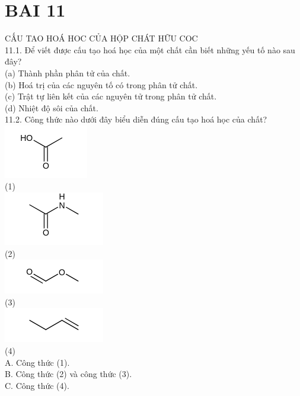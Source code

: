 \documentclass[10pt]{article}
\begin{document}
\section*{BAI 11}
CẤU TAO HOÁ HOC CỦA HỘP CHÁT HỮU COC\\
11.1. Để viết được cấu tạo hoá học của một chất cần biết những yếu tố nào sau đây?\\
(a) Thành phần phân tử của chất.\\
(b) Hoá trị của các nguyên tố có trong phân tử chất.\\
(c) Trật tự liên kết của các nguyên tử trong phân tử chất.\\
(d) Nhiệt độ sôi của chất.\\
11.2. Công thức nào dưới đây biểu diễn đúng cấu tạo hoá học của chất?\\
\includegraphics{smile-9000b27412d205ecfecaef73471a400232ff3abb}\\
(1)\\
\includegraphics{smile-0c114765a9fce6331c4c2db89276fe2851534cd4}\\
(2)\\
\includegraphics{smile-a0dbca82130c0164dadcb9ebb08c53d61f06568e}\\
(3)\\
\includegraphics{smile-f0e852ad23e0cdece8a256de9af0bb0d2f954728}\\
(4)\\
A. Công thức (1).\\
B. Công thức (2) và công thức (3).\\
C. Công thức (4).\\
\end{document}
